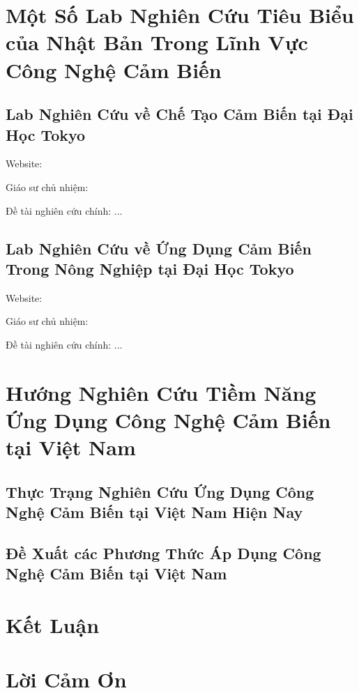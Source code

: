 \documentclass[runningheads]{llncs}
\begin{document}
\section{Một Số Lab Nghiên Cứu Tiêu Biểu của Nhật Bản Trong Lĩnh Vực Công Nghệ Cảm Biến}
\subsection{Lab Nghiên Cứu về Chế Tạo Cảm Biến tại Đại Học Tokyo}

Website: 

Giáo sư chủ nhiệm: 

Đề tài nghiên cứu chính: ...

\subsection{Lab Nghiên Cứu về Ứng Dụng Cảm Biến Trong Nông Nghiệp tại Đại Học Tokyo}

Website: 

Giáo sư chủ nhiệm: 

Đề tài nghiên cứu chính: ...

\section{Hướng Nghiên Cứu Tiềm Năng Ứng Dụng Công Nghệ Cảm Biến tại Việt Nam}
\subsection{Thực Trạng Nghiên Cứu Ứng Dụng Công Nghệ Cảm Biến tại Việt Nam Hiện Nay}
\lipsum[1-2]

\subsection{Đề Xuất các Phương Thức Áp Dụng Công Nghệ Cảm Biến tại Việt Nam}
\lipsum[3-4]

\section{Kết Luận}
\lipsum[5]

\section{Lời Cảm Ơn}
\lipsum[6]
\end{document}
